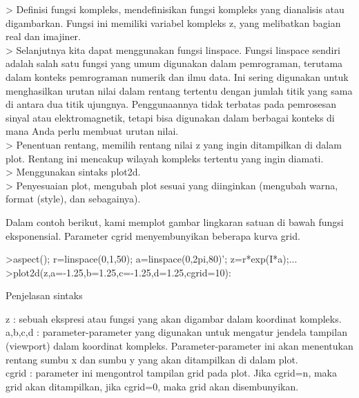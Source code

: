 \documentclass[a4paper,10pt]{article}
\begin{document}
\begin{eulernotebook}
\begin{eulercomment}
\begin{eulercomment}
\begin{eulercomment}
\textgreater{} Definisi fungsi kompleks, mendefinisikan fungsi kompleks yang
dianalisis atau digambarkan. Fungsi ini memiliki variabel kompleks z,
yang melibatkan bagian real dan imajiner.\\
\textgreater{} Selanjutnya kita dapat menggunakan fungsi linspace. Fungsi linspace
sendiri adalah salah satu fungsi yang umum digunakan dalam
pemrograman, terutama dalam konteks pemrograman numerik dan ilmu data.
Ini sering digunakan untuk menghasilkan urutan nilai dalam rentang
tertentu dengan jumlah titik yang sama di antara dua titik ujungnya.
Penggunaannya tidak terbatas pada pemrosesan sinyal atau
elektromagnetik, tetapi bisa digunakan dalam berbagai konteks di mana
Anda perlu membuat urutan nilai.\\
\textgreater{} Penentuan rentang, memilih rentang nilai z yang ingin ditampilkan di
dalam plot. Rentang ini mencakup wilayah kompleks tertentu yang ingin
diamati.\\
\textgreater{} Menggunakan sintaks plot2d.\\
\textgreater{} Penyesuaian plot, mengubah plot sesuai yang diinginkan (mengubah
warna, format (style), dan sebagainya).

Dalam contoh berikut, kami memplot gambar lingkaran satuan di bawah
fungsi eksponensial. Parameter cgrid menyembunyikan beberapa kurva
grid.

\begin{eulercomment}
\begin{eulerprompt}
>aspect(); r=linspace(0,1,50); a=linspace(0,2pi,80)'; z=r*exp(I*a);...
>plot2d(z,a=-1.25,b=1.25,c=-1.25,d=1.25,cgrid=10):
\end{eulerprompt}
\begin{eulercomment}
Penjelasan sintaks

z       : sebuah ekspresi atau fungsi yang akan digambar dalam
koordinat kompleks.\\
a,b,c,d : parameter-parameter yang digunakan untuk mengatur jendela
tampilan (viewport) dalam koordinat kompleks. Parameter-parameter ini
akan menentukan rentang sumbu x dan sumbu y yang akan ditampilkan di
dalam plot.\\
cgrid   : parameter ini mengontrol tampilan grid pada plot. Jika
cgrid=n, maka grid akan ditampilkan, jika cgrid=0, maka grid akan
disembunyikan.


\end{eulercomment}
\end{eulercomment}
\end{eulercomment}
\end{eulercomment}
\end{eulercomment}
\end{eulernotebook}
\end{document}
